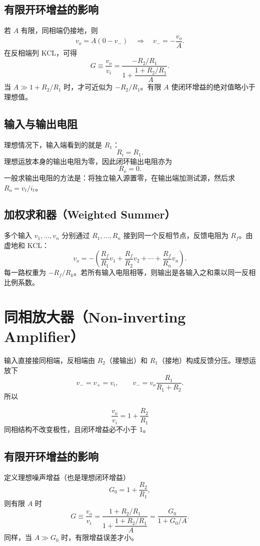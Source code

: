 \documentclass[11pt,fontset=none]{ctexart}
\newcommand{\vo}{v_o}
\newcommand{\vi}{v_i}
\newcommand{\vp}{v_+}
\newcommand{\vn}{v_-}
\begin{document}
\subsection{有限开环增益的影响}

若 $A$ 有限，同相端仍接地，则
\[
  \vo=A(0-\vn)\quad\Rightarrow\quad \vn=-\frac{\vo}{A}.
\]
在反相端列 KCL，可得
\[
  \boxed{
  G\equiv\frac{\vo}{\vi}
  =\frac{-R_2/R_1}{1+\dfrac{1+R_2/R_1}{A}}
  }.
\]
当 $A\gg 1+R_2/R_1$ 时，才可近似为 $-R_2/R_1$。有限 $A$ 使闭环增益的绝对值略小于理想值。

\subsection{输入与输出电阻}

理想情况下，输入端看到的就是 $R_1$：
\[
  \boxed{R_i=R_1}.
\]
理想运放本身的输出电阻为零，因此闭环输出电阻亦为
\[
  \boxed{R_o=0}.
\]
一般求输出电阻的方法是：将独立输入源置零，在输出端加测试源，然后求 $R_o=v_t/i_t$。

\subsection{加权求和器（Weighted Summer）}

多个输入 $v_1,\ldots,v_n$ 分别通过 $R_1,\ldots,R_n$ 接到同一个反相节点，反馈电阻为 $R_f$。由虚地和 KCL：
\[
  \boxed{
  \vo=-\left(\frac{R_f}{R_1}v_1+\frac{R_f}{R_2}v_2+\cdots+\frac{R_f}{R_n}v_n\right)
  }.
\]
每一路权重为 $-R_f/R_k$。若所有输入电阻相等，则输出是各输入之和乘以同一反相比例系数。

\section{同相放大器（Non-inverting Amplifier）}

输入直接接同相端，反相端由 $R_2$（接输出）和 $R_1$（接地）构成反馈分压。理想运放下
\[
  \vn=\vp=\vi,
  \qquad
  \vn=\vo\frac{R_1}{R_1+R_2}.
\]
所以
\begin{keybox}
\[
  \boxed{\frac{\vo}{\vi}=1+\frac{R_2}{R_1}}
\]
同相结构不改变极性，且闭环增益必不小于 1。
\end{keybox}

\subsection{有限开环增益的影响}

定义理想噪声增益（也是理想闭环增益）
\[
  G_0=1+\frac{R_2}{R_1},
\]
则有限 $A$ 时
\[
  \boxed{
  G\equiv\frac{\vo}{\vi}
  =\frac{1+R_2/R_1}{1+\dfrac{1+R_2/R_1}{A}}
  =\frac{G_0}{1+G_0/A}
  }.
\]
同样，当 $A\gg G_0$ 时，有限增益误差才小。
\end{document}
